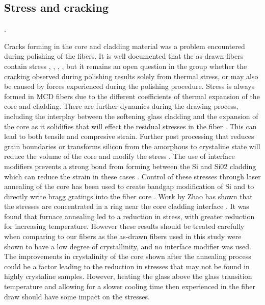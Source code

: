 \subsection{Stress and cracking}. 

Cracks forming in the core and cladding material was a problem encountered during polishing of the fibers. It is well documented that the as-drawn fibers contain stress \cite{Healy2018AFibres}, \cite{Fokine2017LaserFibers}, \cite{LapointeElectricalFibres}, \cite{KristinKristin_thesis_final}, but it remains an open question in the group whether the cracking observed during polishing results solely from thermal stress, or may also be caused by forces experienced during the polishing procedure. 
Stress is always formed in MCD fibers due to the different coefficients of thermal expansion of the core and cladding. There are further dynamics during the drawing process, including the interplay between the softening glass cladding and the expansion of the core as it solidifies that will effect the residual stresses in the fiber \cite{Healy2018AFibres}. This can lead to both tensile and compresive strain. Further post processing that reduces grain boundaries or transforms silicon from the amorphous to crystaline state will reduce the volume of the core and modify the stress \cite{Zhao2017EffectFibre}. The use of interface modifiers prevents a strong bond from forming between the Si and Si02 cladding which can reduce the strain in these cases \cite{Gibson2013AlkalineFibers}. 
Control of these stresses through laser annealing of the core has been used to create bandgap modification of Si  \cite{Healy2014ExtremeFibres} and to directly write bragg gratings into the fiber core \cite{Fokine2017LaserFibers}. Work by Zhao has shown that the stresses are concentrated in a ring near the core cladding interface \cite{Zhao2018EffectsFiber}. It was found that furnace annealing led to a reduction in stress, with greater reduction for increasing temperature. However these results should be treated carefully when comparing to our fibers as the as-drawn fibers used in this study were shown to have a low degree of crystallinity, and no interface modifier was used. The improvements in crystalinity of the core shown after the annealing process could be a factor leading to the reduction in stresses that may not be found in highly crystaline samples. However, heating the glass above the glass transition temperature and allowing for a slower cooling time then experienced in the fiber draw should have some impact on the stresses.

